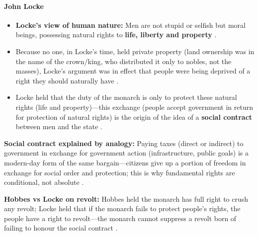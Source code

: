 \paragraph{John Locke}
\begin{KeyConcept}
\begin{itemize}
    \item \textbf{Locke's view of human nature:} Men are not stupid or selfish but moral beings, possessing natural rights to \textbf{life, liberty and property} .
    \item Because no one, in Locke's time, held private property (land ownership was in the name of the crown/king, who distributed it only to nobles, not the masses), Locke's argument was in effect that people were being deprived of a right they should naturally have .
    \item Locke held that the duty of the monarch is only to protect these natural rights (life and property)---this exchange (people accept government in return for protection of natural rights) is the origin of the idea of a \textbf{social contract} between men and the state .
\end{itemize}
\end{KeyConcept}

\begin{GovtPolicy}
\textbf{Social contract explained by analogy:} Paying taxes (direct or indirect) to government in exchange for government action (infrastructure, public goals) is a modern-day form of the same bargain---citizens give up a portion of freedom in exchange for social order and protection; this is why fundamental rights are conditional, not absolute .

\textbf{Hobbes vs Locke on revolt:} Hobbes held the monarch has full right to crush any revolt; Locke held that if the monarch fails to protect people's rights, the people have a right to revolt---the monarch cannot suppress a revolt born of failing to honour the social contract .
\end{GovtPolicy}

